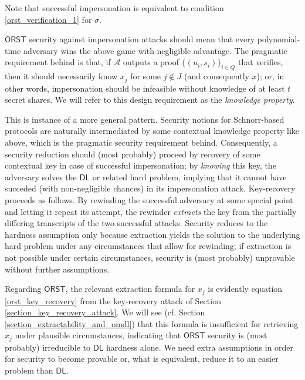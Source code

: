 \documentclass[10pt, psamsfonts, reqno]{amsart}
\theoremstyle{definition}
\theoremstyle{remark}
\numberwithin{equation}{section}
\begin{document}
\noindent
Note that successful impersonation is equivalent
to condition \eqref{orst_verification_1} for $\sigma$.

$\mathsf{ORST}$ security against impersonation attacks should mean
that every polynomial-time adversary wins the above game
with negligible advantage.
The pragmatic requirement behind is that,
if $\mathcal{A}$ outputs a proof
$\{(u_i, s_i)\}_{i \in Q}$ that verifies,
then it should necessarily know $x_j$ for some $j \not \in J$
(and consequently $x$); or, in other words,
impersonation should be infeasible
without knowledge of at least $t$ secret shares.
We will refer to this design requirement
as the \textit{knowledge property}.

This is instance of a more general pattern.
Security notions for Schnorr-based protocols
are naturally intermediated by some
contextual knowledge property like above,
which is the pragmatic security requirement behind.
Consequently,
a security reduction should (most probably)
proceed by recovery
of some contextual key in case of successful impersonation;
by \textit{knowing} this key, the adversary solves
the $\mathsf{DL}$ or related hard problem,
implying that it cannot have succeded
(with non-negligible chances) in its impersonation attack.
Key-recovery proceeds as follows.
By rewinding the successful adversary
at some special point and letting it repeat
its attempt,
the rewinder \textit{extracts} the key
from the partially differing transcripts
of the two successful attacks.
Security reduces to the hardness assumption only because
extraction yields the solution to the underlying hard problem
under any circumstances that allow for rewinding;
if extraction is not possible under certain circumstances,
security is (most probably)
unprovable without further assumptions.

Regarding $\mathsf{ORST}$,
the relevant extraction formula for $x_j$
is evidently equation \eqref{orst_key_recovery}
from the key-recovery attack
of Section \ref{section_key_recovery_attack}.
We will see
(cf. Section \ref{section_extractability_and_omdl})
that this formula is insufficient for retrieving $x_j$
under plausible circumstances,
indicating that $\mathsf{ORST}$ security
is (most probably) irreducible
to $\mathsf{DL}$ hardness alone.
We need extra assumptions in order
for security to become provable
or, what is equivalent,
reduce it to an easier problem than $\mathsf{DL}$.
\end{document}
